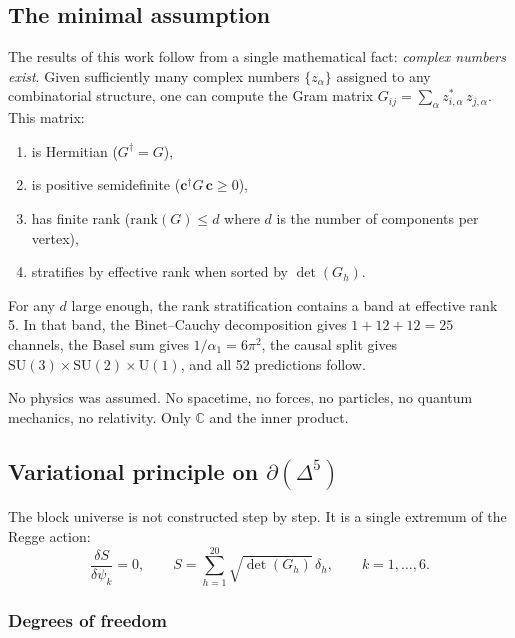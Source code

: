 \documentclass[12pt]{article}
\theoremstyle{remark}
\theoremstyle{definition}
\begin{document}
\subsection{The minimal assumption}

The results of this work follow from a single mathematical fact: \emph{complex numbers exist}. Given sufficiently many complex numbers $\{z_\alpha\}$ assigned to any combinatorial structure, one can compute the Gram matrix $G_{ij} = \sum_\alpha z^*_{i,\alpha}\,z_{j,\alpha}$. This matrix:
\begin{enumerate}
\item is Hermitian ($G^\dagger = G$),
\item is positive semidefinite ($\mathbf{c}^\dagger G\,\mathbf{c} \geq 0$),
\item has finite rank ($\text{rank}(G) \leq d$ where $d$ is the number of components per vertex),
\item stratifies by effective rank when sorted by $\det(G_h)$.
\end{enumerate}

For any $d$ large enough, the rank stratification contains a band at effective rank 5. In that band, the Binet--Cauchy decomposition gives $1 + 12 + 12 = 25$ channels, the Basel sum gives $1/\alpha_1 = 6\pi^2$, the causal split gives $\text{SU}(3) \times \text{SU}(2) \times \text{U}(1)$, and all 52 predictions follow.

No physics was assumed. No spacetime, no forces, no particles, no quantum mechanics, no relativity. Only $\mathbb{C}$ and the inner product.

\subsection{Variational principle on $\partial(\Delta^5)$}
\label{sec:variational}

The block universe is not constructed step by step.  It is a single extremum of the Regge action:
\begin{equation}
\frac{\delta S}{\delta\psi_k} = 0, \qquad S = \sum_{h=1}^{20} \sqrt{\det(G_h)}\,\delta_h, \qquad k = 1,\ldots,6.
\end{equation}

\subsubsection{Degrees of freedom}
\end{document}
